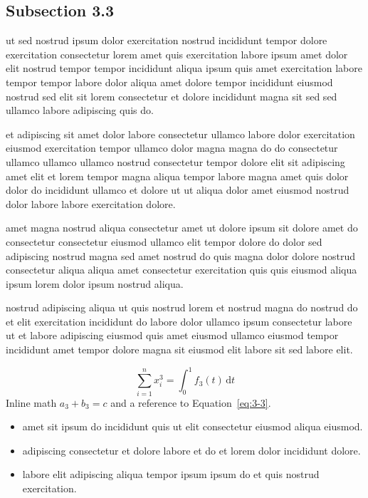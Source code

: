 \documentclass{article}
\begin{document}
\subsection{Subsection 3.3}\label{sec:3-3}
ut sed nostrud ipsum dolor exercitation nostrud incididunt tempor dolore exercitation consectetur lorem amet quis exercitation labore ipsum amet dolor elit nostrud tempor tempor incididunt aliqua ipsum quis amet exercitation labore tempor tempor labore dolor aliqua amet dolore tempor incididunt eiusmod nostrud sed elit sit lorem consectetur et dolore incididunt magna sit sed sed ullamco labore adipiscing quis do.

et adipiscing sit amet dolor labore consectetur ullamco labore dolor exercitation eiusmod exercitation tempor ullamco dolor magna magna do do consectetur ullamco ullamco ullamco nostrud consectetur tempor dolore elit sit adipiscing amet elit et lorem tempor magna aliqua tempor labore magna amet quis dolor dolor do incididunt ullamco et dolore ut ut aliqua dolor amet eiusmod nostrud dolor labore labore exercitation dolore.

amet magna nostrud aliqua consectetur amet ut dolore ipsum sit dolore amet do consectetur consectetur eiusmod ullamco elit tempor dolore do dolor sed adipiscing nostrud magna sed amet nostrud do quis magna dolor dolore nostrud consectetur aliqua aliqua amet consectetur exercitation quis quis eiusmod aliqua ipsum lorem dolor ipsum nostrud aliqua.

nostrud adipiscing aliqua ut quis nostrud lorem et nostrud magna do nostrud do et elit exercitation incididunt do labore dolor ullamco ipsum consectetur labore ut et labore adipiscing eiusmod quis amet eiusmod ullamco eiusmod tempor incididunt amet tempor dolore magna sit eiusmod elit labore sit sed labore elit.

\begin{equation}\label{eq:3-3}
  \sum_{i=1}^{n} x_i^{3} = \int_0^1 f_{3}(t)\,\mathrm{d}t
\end{equation}
Inline math $a_{3} + b_{3} = c$ and a reference to Equation~\eqref{eq:3-3}.

\begin{itemize}
  \item amet sit ipsum do incididunt quis ut elit consectetur eiusmod aliqua eiusmod.
  \item adipiscing consectetur et dolore labore et do et lorem dolor incididunt dolore.
  \item labore elit adipiscing aliqua tempor ipsum ipsum do et quis nostrud exercitation.
\end{itemize}
\end{document}
